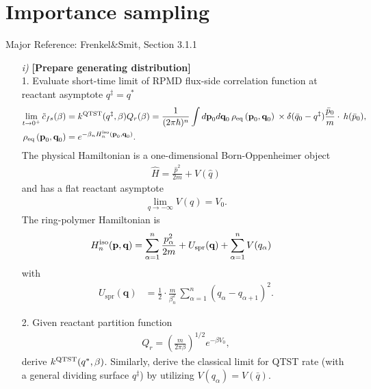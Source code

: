 \documentclass[aip,graphicx,sd, amsmath,amssymb]{revtex4-1}
\begin{document}
\section{Importance sampling}
Major Reference: Frenkel\&Smit, Section 3.1.1

\begin{enumerate}
\item[\it{i})] \textbf{[Prepare generating distribution]} \\
1. Evaluate short-time limit of RPMD flux-side correlation function at reactant asymptote $q^{\ddagger} = q^*$
\begin{align}
 \lim_{t \to 0^+} {\tilde{c}_{fs}}(\beta) &= k^{\rm QTST}(q^{\ddagger}, \beta) Q_r(\beta) =  \frac1{(2\pi \hbar)^n}  
\int d\textbf{p}_0 d\textbf{q}_0 \hspace{2pt}  
\rho_{\rm eq} \left(\textbf{p}_0, \textbf{q}_0 \right) \hspace{2pt} 
\times \delta({\bar{q}_0- q^\ddagger}) \frac{\bar{p}_0}{m} \cdot  \hspace{2pt} h(\bar{p}_0), \nonumber \\
\rho_{\rm eq} \left(\textbf{p}_0, \textbf{q}_0 \right) &= e^{-\beta_n H_n^{\rm iso} \left(\textbf{p}_0, \textbf{q}_0 \right)}.
\end{align}
The physical Hamiltonian is a one-dimensional Born-Oppenheimer object 
\begin{align}
\hat{H} = \frac{\hat{p}^2}{2m} + V(\hat{q})
\end{align}
and has a flat reactant asymptote 
\begin{align}
\lim_{q\to -\infty} V(q) = V_0.
\end{align}
The ring-polymer Hamiltonian is
\begin{align}  \label{rpmdH}
H_n^{\rm iso}(\textbf{p}, \textbf{q}) &= \sum_{\alpha=1}^n \frac{p_{\alpha}^2}{2m}  + U_{\text{spr}}(\textbf{q})   + \sum_{\alpha=1}^n V(q_{\alpha})
\end{align} 
with 
\begin{align}
U_{\text{spr}}(\textbf{q}) &=\frac12 \cdot  \frac{m}{\beta_n^2} \, \sum_{\alpha=1}^n   \left( q_{\alpha} - q_{\alpha+1} \right)^2.
\end{align}

2. Given reactant partition function
\begin{align}
Q_r = \left( \frac{m}{2 \pi \beta} \right)^{1/2} e^{-\beta V_0},
\end{align}
derive $k^{\rm QTST}(q^*, \beta)$.
Similarly, derive the classical limit for QTST rate (with a general dividing surface $q^{\ddagger}$) by utilizing $V(q_\alpha) = V (\bar{q})$.


\end{enumerate}
\end{document}
